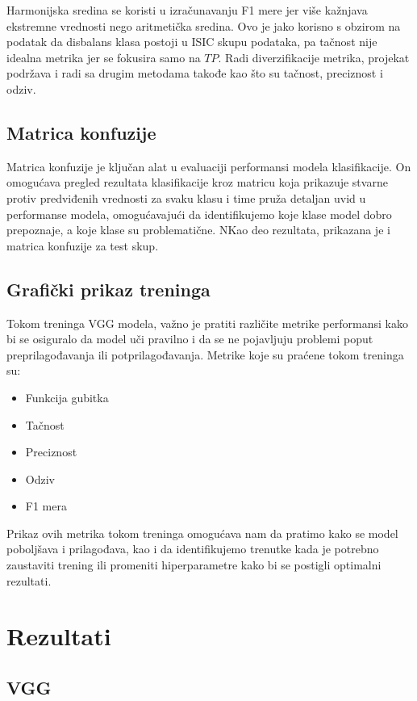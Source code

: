 \documentclass{article}
\begin{document}
Harmonijska sredina se koristi u izračunavanju F1 mere jer više kažnjava ekstremne vrednosti nego aritmetička sredina. Ovo je jako korisno s obzirom na podatak da disbalans klasa postoji u ISIC skupu podataka, pa tačnost nije idealna metrika jer se fokusira samo na $TP$. Radi diverzifikacije metrika, projekat podržava i radi sa drugim metodama takođe kao što su tačnost, preciznost i odziv.

\subsection{Matrica konfuzije}

Matrica konfuzije je ključan alat u evaluaciji performansi modela klasifikacije. On omogućava pregled rezultata klasifikacije kroz matricu koja prikazuje stvarne protiv predviđenih vrednosti za svaku klasu i time pruža detaljan uvid u performanse modela, omogućavajući da identifikujemo koje klase model dobro prepoznaje, a koje klase su problematične. NKao deo rezultata, prikazana je i matrica konfuzije za test skup.

\subsection{Grafički prikaz treninga}

Tokom treninga VGG modela, važno je pratiti različite metrike performansi kako bi se osiguralo da model uči pravilno i da se ne pojavljuju problemi poput preprilagođavanja ili potprilagođavanja. Metrike koje su praćene tokom treninga su:
\begin{itemize}
    \item Funkcija gubitka
    \item Tačnost
    \item Preciznost
    \item Odziv
    \item F1 mera
\end{itemize}

Prikaz ovih metrika tokom treninga omogućava nam da pratimo kako se model poboljšava i prilagođava, kao i da identifikujemo trenutke kada je potrebno zaustaviti trening ili promeniti hiperparametre kako bi se postigli optimalni rezultati.


\section{Rezultati}

\subsection{VGG}
\end{document}
